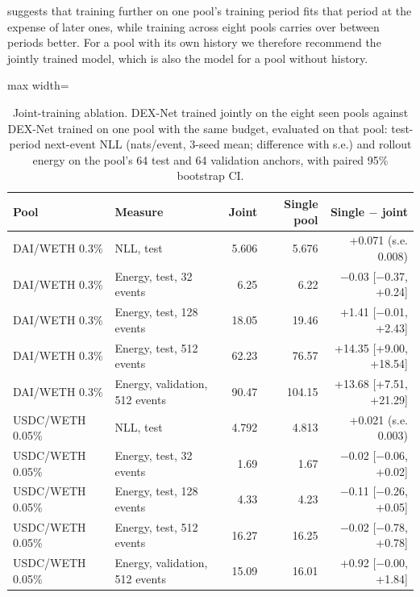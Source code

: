 \documentclass[11pt]{article}
\begin{document}
suggests that training further on one pool's training period fits that period at the expense of later ones, while training across eight pools carries over between periods better. For a pool with its own history we therefore recommend the jointly trained model, which is also the model for a pool without history.

\begin{table}[t]
\centering
\caption{Joint-training ablation. DEX-Net trained jointly on the eight seen pools against DEX-Net trained on one pool with the same budget, evaluated on that pool: test-period next-event NLL (nats/event, 3-seed mean; difference with s.e.) and rollout energy on the pool's 64 test and 64 validation anchors, with paired 95\% bootstrap CI.}\label{tab:9}
\begin{adjustbox}{max width=\linewidth}
\begin{tabular}{llrrr}
\toprule
Pool & Measure & Joint & Single pool & Single \ensuremath{-} joint \\
\midrule
DAI/WETH 0.3\% & NLL, test & 5.606 & 5.676 & +0.071 (s.e. 0.008) \\
DAI/WETH 0.3\% & Energy, test, 32 events & 6.25 & 6.22 & \ensuremath{-}0.03 [\ensuremath{-}0.37, +0.24] \\
DAI/WETH 0.3\% & Energy, test, 128 events & 18.05 & 19.46 & +1.41 [\ensuremath{-}0.01, +2.43] \\
DAI/WETH 0.3\% & Energy, test, 512 events & 62.23 & 76.57 & +14.35 [+9.00, +18.54] \\
DAI/WETH 0.3\% & Energy, validation, 512 events & 90.47 & 104.15 & +13.68 [+7.51, +21.29] \\
USDC/WETH 0.05\% & NLL, test & 4.792 & 4.813 & +0.021 (s.e. 0.003) \\
USDC/WETH 0.05\% & Energy, test, 32 events & 1.69 & 1.67 & \ensuremath{-}0.02 [\ensuremath{-}0.06, +0.02] \\
USDC/WETH 0.05\% & Energy, test, 128 events & 4.33 & 4.23 & \ensuremath{-}0.11 [\ensuremath{-}0.26, +0.05] \\
USDC/WETH 0.05\% & Energy, test, 512 events & 16.27 & 16.25 & \ensuremath{-}0.02 [\ensuremath{-}0.78, +0.78] \\
USDC/WETH 0.05\% & Energy, validation, 512 events & 15.09 & 16.01 & +0.92 [\ensuremath{-}0.00, +1.84] \\
\bottomrule
\end{tabular}
\end{adjustbox}
\end{table}
\end{document}
